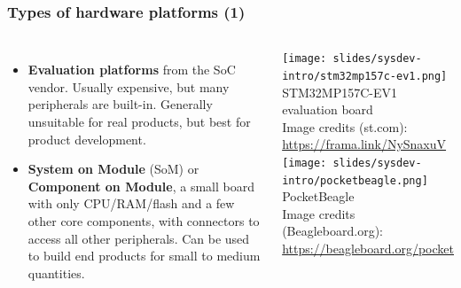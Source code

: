 \begin{frame}
  \frametitle{Types of hardware platforms (1)}
  \begin{columns}
  \begin{itemize}
  \item {\bf Evaluation platforms} from the SoC vendor. Usually
    expensive, but many peripherals are built-in. Generally unsuitable
    for real products, but best for product development.
  \item {\bf System on Module} (SoM) or {\bf Component on Module}, a small
    board with only CPU/RAM/flash and a few other core components, with
    connectors to access all other peripherals. Can be used to build end
    products for small to medium quantities.
  \end{itemize}
    \texttt{[image: slides/sysdev-intro/stm32mp157c-ev1.png]}
    \scriptsize
    STM32MP157C-EV1 evaluation board\\
    \tiny
    Image credits (st.com):\\
    \url{https://frama.link/NySnaxuV}\\
    \vspace{0.5cm}
    \texttt{[image: slides/sysdev-intro/pocketbeagle.png]}
    \scriptsize
    PocketBeagle\\
    \tiny
    Image credits (Beagleboard.org):\\
    \url{https://beagleboard.org/pocket}
  \end{columns}
\end{frame}

